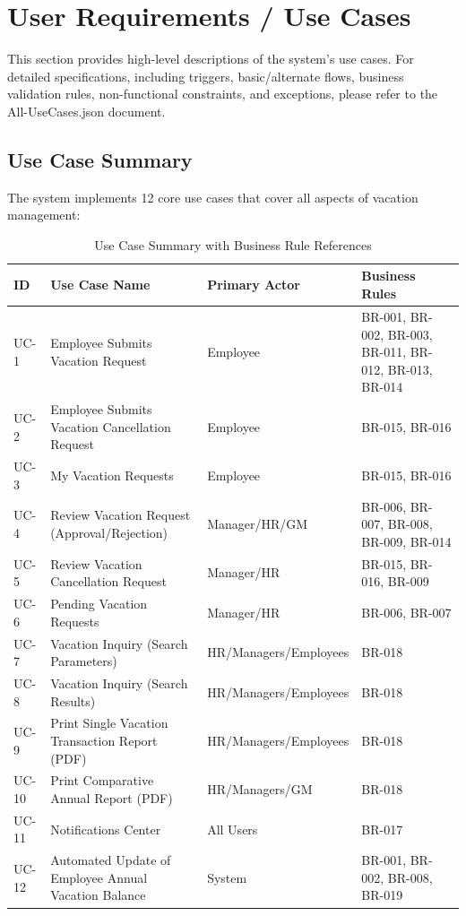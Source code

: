\documentclass[12pt,a4paper]{article}
\begin{document}
\section{User Requirements / Use Cases}

This section provides high-level descriptions of the system's use cases. For detailed specifications, including triggers, basic/alternate flows, business validation rules, non-functional constraints, and exceptions, please refer to the All-UseCases.json document.

\subsection{Use Case Summary}
The system implements 12 core use cases that cover all aspects of vacation management:

\begin{table}[H]
\centering
\begin{tabular}{|p{1cm}|p{4cm}|p{3cm}|p{3cm}|}
\hline
\textbf{ID} & \textbf{Use Case Name} & \textbf{Primary Actor} & \textbf{Business Rules} \\
\hline
UC-1 & Employee Submits Vacation Request & Employee & BR-001, BR-002, BR-003, BR-011, BR-012, BR-013, BR-014 \\
\hline
UC-2 & Employee Submits Vacation Cancellation Request & Employee & BR-015, BR-016 \\
\hline
UC-3 & My Vacation Requests & Employee & BR-015, BR-016 \\
\hline
UC-4 & Review Vacation Request (Approval/Rejection) & Manager/HR/GM & BR-006, BR-007, BR-008, BR-009, BR-014 \\
\hline
UC-5 & Review Vacation Cancellation Request & Manager/HR & BR-015, BR-016, BR-009 \\
\hline
UC-6 & Pending Vacation Requests & Manager/HR & BR-006, BR-007 \\
\hline
UC-7 & Vacation Inquiry (Search Parameters) & HR/Managers/Employees & BR-018 \\
\hline
UC-8 & Vacation Inquiry (Search Results) & HR/Managers/Employees & BR-018 \\
\hline
UC-9 & Print Single Vacation Transaction Report (PDF) & HR/Managers/Employees & BR-018 \\
\hline
UC-10 & Print Comparative Annual Report (PDF) & HR/Managers/GM & BR-018 \\
\hline
UC-11 & Notifications Center & All Users & BR-017 \\
\hline
UC-12 & Automated Update of Employee Annual Vacation Balance & System & BR-001, BR-002, BR-008, BR-019 \\
\hline
\end{tabular}
\caption{Use Case Summary with Business Rule References}
\end{table}
\end{document}
